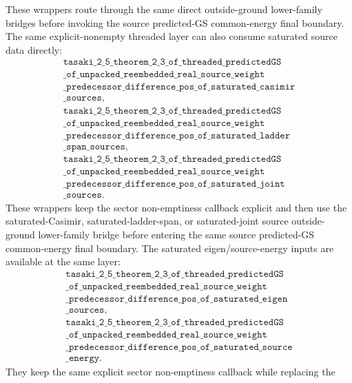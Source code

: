 \documentclass[a4paper,11pt]{article}
\begin{document}
These wrappers route through the same direct outside-ground lower-family
bridges before invoking the source predicted-GS common-energy final boundary.
The same explicit-nonempty threaded layer can also consume saturated source
data directly:
\[
\begin{gathered}
\texttt{tasaki\_2\_5\_theorem\_2\_3\_of\_threaded\_predictedGS}\\
\texttt{\_of\_unpacked\_reembedded\_real\_source\_weight}\\
\texttt{\_predecessor\_difference\_pos\_of\_saturated\_casimir}\\
\texttt{\_sources},\\
\texttt{tasaki\_2\_5\_theorem\_2\_3\_of\_threaded\_predictedGS}\\
\texttt{\_of\_unpacked\_reembedded\_real\_source\_weight}\\
\texttt{\_predecessor\_difference\_pos\_of\_saturated\_ladder}\\
\texttt{\_span\_sources},\\
\texttt{tasaki\_2\_5\_theorem\_2\_3\_of\_threaded\_predictedGS}\\
\texttt{\_of\_unpacked\_reembedded\_real\_source\_weight}\\
\texttt{\_predecessor\_difference\_pos\_of\_saturated\_joint}\\
\texttt{\_sources}.
\end{gathered}
\]
These wrappers keep the sector non-emptiness callback explicit and then use
the saturated-Casimir, saturated-ladder-span, or saturated-joint source
outside-ground lower-family bridge before entering the same source
predicted-GS common-energy final boundary.
The saturated eigen/source-energy inputs are available at the same layer:
\[
\begin{gathered}
\texttt{tasaki\_2\_5\_theorem\_2\_3\_of\_threaded\_predictedGS}\\
\texttt{\_of\_unpacked\_reembedded\_real\_source\_weight}\\
\texttt{\_predecessor\_difference\_pos\_of\_saturated\_eigen}\\
\texttt{\_sources},\\
\texttt{tasaki\_2\_5\_theorem\_2\_3\_of\_threaded\_predictedGS}\\
\texttt{\_of\_unpacked\_reembedded\_real\_source\_weight}\\
\texttt{\_predecessor\_difference\_pos\_of\_saturated\_source}\\
\texttt{\_energy}.
\end{gathered}
\]
They keep the same explicit sector non-emptiness callback while replacing the
\end{document}
